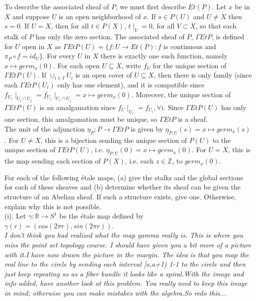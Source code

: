 To describe the associated sheaf of $P$, we must first describe $Et(P)$. Let $x$ be in $X$ and suppose $U$ is an open neighborhood of $x$. If $s \in P(U)$ and $U \neq X$ then $s=0$. If $U = X$, then for all $t \in P(X)$, $t\mid_V = 0$, for all $V \subset X$, so that each stalk of $P$ has only the zero section. The associated sheaf of $P$, $\Gamma Et P$, is defined for $U$ open in $X$ as $\Gamma EtP (U) = \{f: U \rightarrow Et(P): f$ is continuous and $\pi_P \circ f = id_U\}$. For every $U$ in $X$ there is exactly one such function, namely $x \mapsto germ_x(0)$. For each open $U \subseteq X$, write $f_U$ for the unique section of $\Gamma EtP(U)$. If $\cup_{i \in I} U_i$ is an open cover of $U \subseteq X$, then there is only family (since each $\Gamma EtP(U_i)$ only has one element), and it is compatible since $f_{U_i}\mid_{U_i \cap U_j} = f_{U_j}\mid_{U_i \cap U_j} =x \mapsto germ_x(0)$. Moreover, the unique section of $\Gamma EtP(U)$ is an amalgamation since $f_U\mid_{U_i} = f_{U_i}, \forall i$. Since $\Gamma EtP(U)$ has only one section, this amalgamation must be unique, so $\Gamma EtP$ is a sheaf.\\

The unit of the adjunction $\eta_P: P \rightarrow \Gamma EtP$ is given by $\eta_{P,U}(s)= x \mapsto germ_x(s)$. For $U \neq X$, this is a bijection sending the unique section of $P(U)$ to the unique section of $\Gamma EtP(U)$, i.e. $\eta_{P,U}(0)= x \mapsto germ_x(0)$. For $U = X$, this is the map sending each section of $P(X)$, i.e. each $z \in \mathbb{Z}$, to $germ_x(0)$. 

 For each of the following \'etale maps, (a) give the stalks and the global sections for each of these sheaves and (b) determine whether its sheaf can be given the structure of an Abelian sheaf. If such a structure exists, give one. Otherwise, explain why this is not possible.\\


(i).  Let $\gamma: \mathbb{R} \rightarrow S^1$ be the \'etale map defined by $\gamma(r) = (cos(2\pi r), sin(2\pi r))$.\\

\textit{I don't think you had realized what the map gamma really is. This is where you miss the point set topology course. I should have given you a bit more of a picture with it.I have now drawn the picture in the margin. The idea is that you map the real line  to the circle by  sending each interval [a,a+1) 1-1 to the circle and then just keep repeating so as a fiber bundle it looks like a spiral.With the image and info added, have another look at this problem. You really need to keep this image in mind; otherwise you can make mistakes with the algebra.So redo this...}\\

